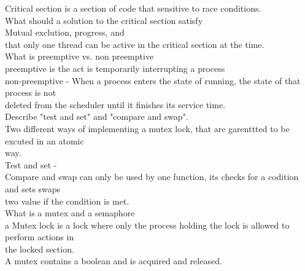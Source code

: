 \documentclass[a4paper,10pt,titlepage]{report}
\begin{document}
\hspace{10mm}  Critical section is a section of code that sensitive to race conditions.\\

What should a solution to the critical section satisfy \\
\hspace{10mm}  Mutual exclution, progress, and \\
\hspace{10mm}  that only one thread can be active in the critical section at the time. \\

What is preemptive vs. non preemptive \\

\hspace{10mm}  preemptive is the act is  temporarily interrupting a process\\

\hspace{10mm}  non-preemptive -  When a process enters the state of running, the state of that process is not \\ \hspace{10mm} deleted from the scheduler until it finishes its service time.\\

Describe "test and set" and "compare and swap". \\

\hspace{10mm}  Two different ways of implementing a mutex lock, that are garenttted to be excuted in an atomic \\ \hspace{10mm} way.\\

\hspace{10mm} Test and set - \\

\hspace{10mm}  Compare and swap can only be used by one function, its checks for a codition and sets swaps \\ \hspace{10mm}  two value if the condition is met.\\ 

What is a mutex and a semaphore \\

\hspace{10mm}  a Mutex lock is a lock where only the process holding the lock is allowed to perform actions in \\ \hspace{10mm}  	the locked section. \\
\hspace{10mm}  A mutex contains a boolean and is acquired and released.\\
\end{document}
